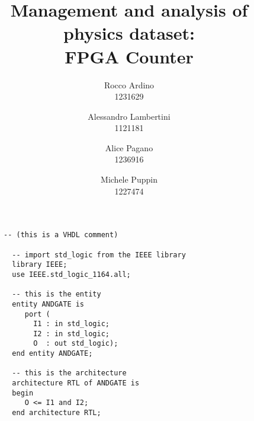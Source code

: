 \documentclass[11pt, a4paper]{article}
\begin{document}
\author{Rocco Ardino\\1231629  \and Alessandro Lambertini\\1121181 \and Alice Pagano \\1236916 \and Michele Puppin \\ 1227474}
\title{\textbf{Management and analysis of physics dataset: \\ FPGA Counter}}
\maketitle

\section{}

\begin{figure}[h!]
\begin{lstlisting}[style=vhdl]
  -- (this is a VHDL comment)

  -- import std_logic from the IEEE library
  library IEEE;
  use IEEE.std_logic_1164.all;

  -- this is the entity
  entity ANDGATE is
     port (
       I1 : in std_logic;
       I2 : in std_logic;
       O  : out std_logic);
  end entity ANDGATE;

  -- this is the architecture
  architecture RTL of ANDGATE is
  begin
     O <= I1 and I2;
  end architecture RTL;
\end{lstlisting}
\caption{\label{}}
\end{figure}
\end{document}
